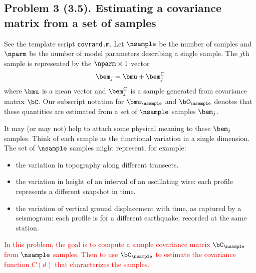 \documentclass[11pt,titlepage,fleqn]{article}
\begin{document}
\pagebreak
\subsection*{Problem 3 (3.5). Estimating a covariance matrix from a set of samples}

See the template script \verb+covrand.m+. Let $\nsample$ be the number of samples and $\nparm$ be the number of model parameters describing a single sample. The $j$th sample is represented by the $\nparm \times 1$ vector
%
\begin{equation}
\bem_j = \bmu + \bem_j^{\rm C}
\label{mj}
\end{equation}
%
where $\bmu$ is a mean vector and $\bem_j^{\rm C}$ is a sample generated from covariance matrix $\bC$. Our subscript notation for $\bmu_\nsample$ and $\bC_\nsample$ denotes that these quantities are estimated from a set of $\nsample$ samples $\bem_j$.

It may (or may not) help to attach some physical meaning to these $\bem_j$ samples. Think of each sample as the functional variation in a single dimension. The set of $\nsample$ samples might represent, for example:
%
\begin{itemize}
\item the variation in topography along different transects.

\item the variation in height of an interval of an oscillating wire: each profile represents a different snapshot in time.

\item the variation of vertical ground displacement with time, as captured by a seismogram: each profile is for a different earthquake, recorded at the same station.

\end{itemize}
%
\textcolor{red}{In this problem, the goal is to compute a sample covariance matrix $\bC_\nsample$ from $\nsample$ samples. Then to use $\bC_\nsample$ to estimate the covariance function $C(d)$ that characterizes the samples.}

\end{document}
